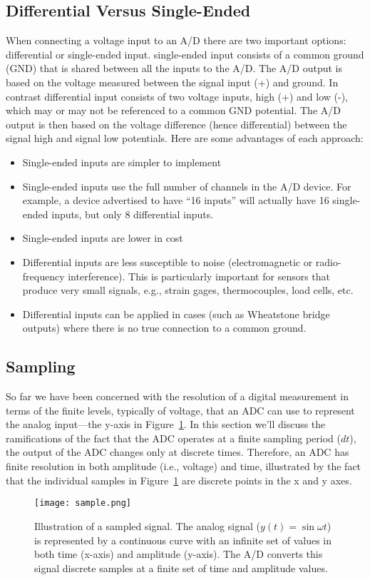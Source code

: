 \subsection{Differential Versus Single-Ended}
When connecting a voltage input to an A/D there are two important options: differential or single-ended input. \Gls{single-ended input} consists of a common ground (GND) that is shared between all the inputs to the A/D.  The A/D output is based on the voltage measured between the signal input (+) and ground.  In contrast \gls{differential input} consists of two voltage inputs, high (+) and low (-), which may or may not be referenced to a common GND potential.  The A/D output is then based on the voltage difference (hence differential) between the signal high and signal low potentials.  Here are some advantages of each approach:
\begin{itemize}
\item Single-ended inputs are simpler to implement
\item Single-ended inputs use the full number of channels in the A/D device. For example, a device advertised to have ``16 inputs'' will actually have 16 single-ended inputs, but only 8 differential inputs.
\item Single-ended inputs are lower in cost
\item Differential inputs are less susceptible to noise (electromagnetic or radio-frequency interference).  This is particularly important for sensors that produce very small signals, e.g., strain gages, thermocouples, load cells, etc.
\item Differential inputs can be applied in cases (such as Wheatstone bridge outputs) where there is no true connection to a common ground.
\end{itemize}

\subsection{Sampling}
So far we have been concerned with the resolution of a digital measurement in terms of the finite levels, typically of voltage, that an ADC can use to represent the analog input---the y-axis in Figure~\ref{f:sample}.  In this section we'll discuss the ramifications of the fact that the ADC operates at a finite \gls{sampling period} ($dt$), the output of the ADC changes only at discrete times.  Therefore, an ADC has finite resolution in both amplitude (i.e., voltage) and time, illustrated by the fact that the individual samples in Figure~\ref{f:sample} are discrete points in the x and y axes.
\begin{figure}[hbt!]
\centering
\texttt{[image: sample.png]}
\caption{Illustration of a sampled signal.  The analog signal ($y(t)=\sin{\omega t}$) is represented by a continuous curve with an infinite set of values in both time (x-axis) and amplitude (y-axis).  The A/D converts this signal discrete samples at a finite set of time and amplitude values.}
\label{f:sample}
\end{figure}

